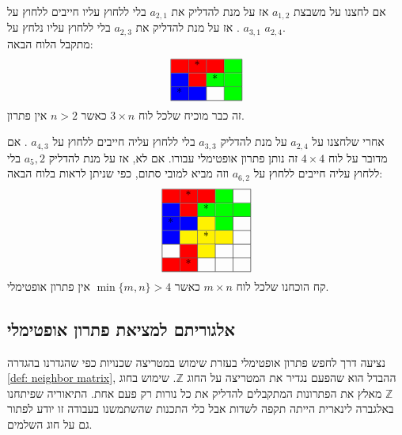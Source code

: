 \documentclass[12pt,leqno]{article}
\theoremstyle{theoremdd}
\begin{document}
אם לחצנו על משבצת 
$a_{1,2}$ 
אז על מנת להדליק את 
$a_{2,1}$
בלי ללחוץ עליו חייבים ללחוץ על 
$a_{3,1}$
.
אז על מנת להדליק 
את 
$a_{2,3}$
בלי ללחוץ עליו נלחץ על 
$a_{2,4}$.
\\
מתקבל הלוח הבאה:
\[\begin{array}{|p{0.2cm}|p{0.2cm}|p{0.2cm}|p{0.2cm}|}
    \hline
    \cellcolor{red} &\cellcolor{red}* &\cellcolor{red}& \cellcolor{green}\\
    \hline
    \cellcolor{blue}& \cellcolor{red}  & \cellcolor{green}* & \cellcolor{green}  \\
    \hline
        \cellcolor{blue}*& \cellcolor{blue}  &  & \cellcolor{green}  \\
    \hline
\end{array}\]
זה כבר מוכיח שלכל 
לוח 
$3 \times n$
כאשר 
$n > 2$
אין פתרון.

אחרי שלחצנו על 
$a_{2,4}$
על מנת להדליק 
$a_{3,3}$
בלי ללחוץ עליה חייבים ללחוץ על 
$a_{4,3}$
.
אם מדובר על 
לוח 
$4 \times 4$
זה נותן פתרון אופטימלי עבורו.
אם לא,
אז על מנת להדליק 
$a_5,2$
בלי ללחוץ עליה חייבים ללחוץ על 
$a_{6,2}$
וזה מביא למובי סתום,
כפי שניתן לראות בלוח הבאה:
\[\begin{array}{|p{0.2cm}|p{0.2cm}|p{0.2cm}|p{0.2cm}|p{0.2cm}|}
    \hline
    \cellcolor{red} &\cellcolor{red}* &\cellcolor{red}& \cellcolor{green} &\\
    \hline
    \cellcolor{blue}& \cellcolor{red}  & \cellcolor{green}* & \cellcolor{green} & \cellcolor{green}  \\
    \hline
    \cellcolor{blue}*& \cellcolor{blue}  & \cellcolor{yellow}  & \cellcolor{green} & \\
    \hline
    \cellcolor{blue}& \cellcolor{yellow}  & \cellcolor{yellow} * & \cellcolor{yellow} &\\
    \hline
        & \cellcolor{red}  &\cellcolor{yellow}  & & \\
        \hline
        \cellcolor{red} &\cellcolor{red}*  &  & & \\
    \hline
\end{array}\]
קח הוכחנו שלכל לוח 
$m \times n$
כאשר 
$\min\{m,n\} > 4$
אין פתרון אופטימלי.

\subsection{אלגוריתם למציאת פתרון אופטימלי}
נציעה דרך לחפש פתרון 
אופטימלי
בעזרת שימוש במטריצה שכנויות כפי שהגדרנו
בהגדרה 
\ref{def: neighbor matrix},
ההבדל הוא שהפעם נגדיר את המטריצה על החוג 
$\mathbb{Z}$.
שימוש בחוג 
$\mathbb{Z}$
מאלץ את הפתרונות המתקבלים
להדליק את כל נורות רק פעם אחת.
התיאוריה שפיתחנו באלגברה לינארית הייתה תקפה לשדות 
אבל כלי התכנות שהשתמשנו
בעבודה זו יודע לפתור גם על חוג השלמים.
\end{document}
